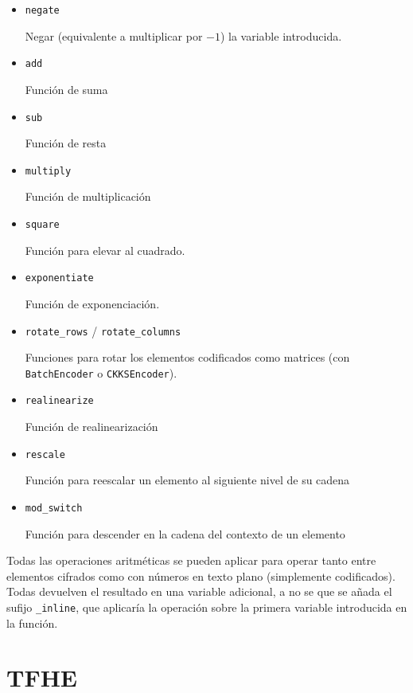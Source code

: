\begin{itemize}
    \item \verb|negate|

    Negar (equivalente a multiplicar por $-1$) la variable introducida.

    \item \verb|add|

    Función de suma

    \item \verb|sub|

    Función de resta

    \item \verb|multiply|

    Función de multiplicación

    \item \verb|square|

    Función para elevar al cuadrado.

    \item \verb|exponentiate|

    Función de exponenciación.

    \item \verb|rotate_rows| /  \verb|rotate_columns|

    Funciones para rotar los elementos codificados como matrices (con \verb|BatchEncoder| o \verb|CKKSEncoder|).

    \item \verb|realinearize|

    Función de realinearización

    \item \verb|rescale|

    Función para reescalar un elemento al siguiente nivel de su cadena

    \item \verb|mod_switch|

    Función para descender en la cadena del contexto de un elemento

\end{itemize}

Todas las operaciones aritméticas se pueden aplicar para operar tanto entre elementos cifrados como con números en texto plano (simplemente codificados). Todas devuelven el resultado en una variable adicional, a no se que se añada el sufijo \verb|_inline|, que aplicaría la operación sobre la primera variable introducida en la función.

\section{TFHE}


